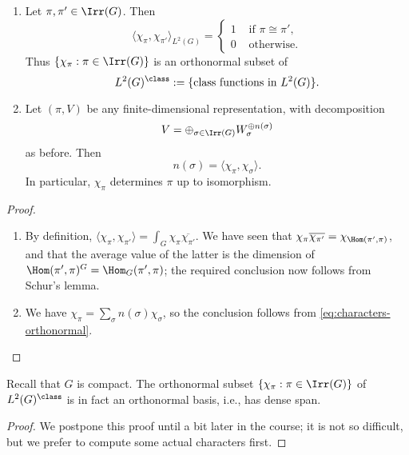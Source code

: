 \documentclass[reqno]{amsart} 
\begin{document}
\begin{theorem}\label{thm:basic-orthogonality-characters}
  \begin{enumerate}
  \item Let $\pi, \pi ' \in \Irr(G)$.  Then
    \begin{equation}\label{eq:characters-orthonormal}
      \langle \chi_\pi, \chi_{\pi '} \rangle_{L^2(G)}
      = 
\begin{cases}
        1 & \text{ if $\pi \cong \pi '$}, \\
        0 & \text{ otherwise.}
      \end{cases}
    \end{equation}
    Thus $\{\chi_\pi : \pi \in \Irr(G)\}$ is an orthonormal subset of
    \begin{equation*}
L^2(G)^{\class} := \{\text{class functions in $L^2(G)$}\}.
    \end{equation*}
  \item Let $(\pi,V)$ be any finite-dimensional representation, with decomposition
    \begin{equation*}
V = \oplus_{\sigma \in \Irr(G)} W_\sigma ^{\oplus n(\sigma)}
\end{equation*}
 as before.  Then
    \begin{equation}\label{eq:}
      n(\sigma) = \langle \chi_\pi, \chi_\sigma  \rangle.
    \end{equation}
    In particular, $\chi_\pi$ determines $\pi$ up to isomorphism.
  \end{enumerate}
\end{theorem}
\begin{proof}
  \begin{enumerate}
  \item By definition, $\langle \chi_{\pi}, \chi_{\pi '} \rangle = \int_G \chi_\pi \overline{\chi_{\pi '}}$.  We have seen that $\chi_\pi \overline{\chi_{\pi '}} = \chi_{\Hom(\pi ', \pi)}$, and that the average value of the latter is the dimension of $\Hom(\pi ', \pi)^G = \Hom_G(\pi ', \pi)$; the required conclusion now follows from Schur's lemma.
  \item We have $\chi_\pi = \sum_\sigma n(\sigma) \chi_\sigma$, so the conclusion follows from \eqref{eq:characters-orthonormal}.
  \end{enumerate}
\end{proof}

\begin{theorem}\label{thm:peter-weyl-for-chars}
  Recall that $G$ is compact.  The orthonormal subset $\{\chi_\pi : \pi \in \Irr(G)\}$ of $L^2(G)^{\class}$ is in fact an orthonormal basis, i.e., has dense span.
\end{theorem}
\begin{proof}
  We postpone this proof until a bit later in the course; it is not so difficult, but we prefer to compute some actual characters first.
\end{proof}
\end{document}
